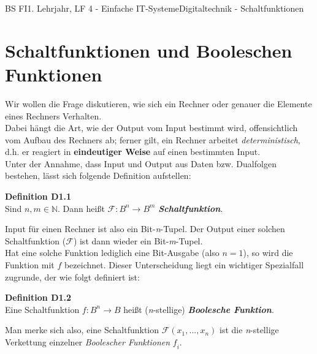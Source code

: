 \documentclass[11pt,twocolumn,oneside,openany,headings=optiontotoc,11pt,numbers=noenddot]{article}
\begin{document}
	\begin{worksheet}{BS FI}{1. Lehrjahr, LF 4 - Einfache IT-Systeme}{Digitaltechnik - Schaltfunktionen}
		\section{Schaltfunktionen und Booleschen Funktionen}
		Wir wollen die Frage diskutieren, wie sich ein Rechner oder genauer die Elemente eines Rechners Verhalten.\\
		Dabei hängt die Art, wie der Output vom Input bestimmt wird, offensichtlich vom Aufbau des Rechners ab; ferner gilt, ein Rechner arbeitet \textit{deterministisch}, d.h. er reagiert in \textbf{eindeutiger Weise} auf einen bestimmten Input.\\
		Unter der Annahme, dass Input und  Output aus Daten bzw. Dualfolgen bestehen, lässt sich folgende Definition aufstellen:
		\begin{framed}
			\textbf{Definition D1.1}\\Sind \(n,m \in \mathbb{N}\). Dann heißt
			\(\mathcal{F}: B^n \rightarrow B^m\) \textit{\textbf{Schaltfunktion}}.
		\end{framed}
		\noindent
		Input für einen Rechner ist also ein Bit-\textit{n}-Tupel. Der Output einer solchen Schaltfunktion (\(\mathcal{F}\)) ist dann wieder ein Bit-\textit{m}-Tupel.\\
		Hat eine solche Funktion lediglich eine Bit-Ausgabe (also \(n = 1\)), so wird die Funktion mit \(\mathit{f}\) bezeichnet. Dieser Unterscheidung liegt ein wichtiger Spezialfall zugrunde, der wie folgt definiert ist:
		\begin{framed}
			\textbf{Definition D1.2}\\Eine Schaltfunktion \(\mathit{f}: B^n \rightarrow B\)
			heißt (\textit{n}-stellige) \textit{\textbf{Boolesche Funktion}}.
		\end{framed}
		Man merke sich also, eine Schaltfunktion \(\mathcal{F}(x_1,...,x_n)\) ist die \textit{n}-stellige Verkettung einzelner \textit{Boolescher Funktionen} \(\mathit{f}_i\).

\end{worksheet}
\end{document}
